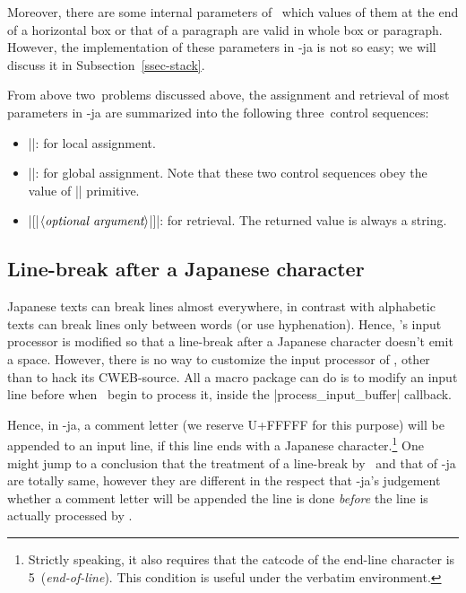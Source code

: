 \documentclass{ajt}
\begin{document}
Moreover, there are some internal parameters of \pTeX\ which values of them at the end of a
horizontal box or that of a paragraph are valid in whole box or
paragraph.  However, the implementation of these parameters in
\LuaTeX-ja is not so easy; we will discuss it in Subsection~\ref{ssec-stack}.

From above two~problems  discussed above, the assignment and retrieval
of most parameters in \LuaTeX-ja are summarized into the following
three~control sequences:
\begin{itemize}
\item ||: for local
      assignment.
\item |\ltjglobalsetparameter|: for global assignment. Note that these two control
      sequences obey the value of |\globaldefs| primitive.
\item |[{|$\langle\hbox{\it optional
      argument}\rangle$|}]|: for retrieval. The returned value is always
      a string.
\end{itemize}

\subsection{Line-break after a Japanese character}
\label{ssec-line} 

Japanese texts can break lines almost everywhere, in contrast with
alphabetic texts can break lines only between words (or use
hyphenation). Hence, \pTeX's input processor is modified so that a
line-break after a Japanese character doesn't emit a space. However,
there is no way to customize the input processor of \LuaTeX, other than
to hack its CWEB-source. All a macro package can do is to modify an input line before
when \LuaTeX\ begin to process it, inside the |process_input_buffer|
callback.

Hence, in \LuaTeX-ja, a comment letter (we reserve U+FFFFF for this
purpose) will be appended to an input line, if this line ends with a Japanese
character.\footnote{Strictly speaking, it also requires that the catcode
of the end-line character is 5~(\emph{end-of-line}). This condition is
useful under the verbatim environment.}  One might jump to a conclusion
that the treatment of a line-break by \pTeX\ and that of \LuaTeX-ja are
totally same, however they are different in the respect that \LuaTeX-ja's
judgement whether a comment letter will be appended the line is done
\emph{before} the line is actually processed by \LuaTeX.
\end{document}
